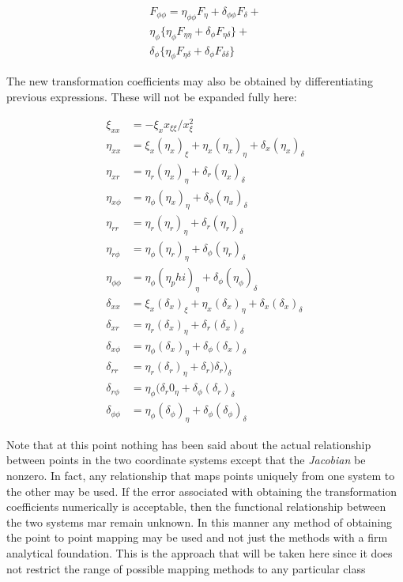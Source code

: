 \begin{multline}
  F_{\phi\phi} = \eta_{\phi\phi} F_\eta + \delta_{\phi\phi} F_\delta + \\
  \eta_\phi \{ \eta_\phi F_{\eta\eta} + \delta_\phi F_{\eta\delta} \} + \\
  \delta_\phi \{ \eta_\phi F_{\eta\delta} + \delta_\phi F_{\delta\delta} \}
\end{multline}

The new transformation coefficients may also be obtained by differentiating
previous expressions. These will not be expanded fully here:

\begin{equation}
  \begin{aligned}
    \xi_{xx} &= -\xi_x x_{\xi\xi}/x_\xi^2 \\
    \eta_{xx} &= \xi_x ( \eta_x)_\xi + \eta_x (\eta_x)_\eta + \delta_x(\eta_x)_\delta \\
    \eta_{xr} &= \eta_r(\eta_x)_\eta + \delta_r(\eta_x)_\delta \\
    \eta_{x\phi} &= \eta_\phi(\eta_x)_\eta + \delta_\phi(\eta_x)_\delta \\
    \eta_{rr} &= \eta_r(\eta_r)_\eta + \delta_r(\eta_r)_\delta \\
    \eta_{r\phi} &= \eta_\phi(\eta_r)_\eta + \delta_\phi(\eta_r)_\delta \\
    \eta_{\phi\phi} &= \eta_\phi(\eta_phi)_\eta + \delta_\phi(\eta_\phi)_\delta \\
    \delta_{xx} &= \xi_x (\delta_x)_\xi + \eta_x(\delta_x)_\eta + \delta_x(\delta_x)_\delta \\
    \delta_{xr} &= \eta_r (\delta_x)_\eta + \delta_r(\delta_x)_\delta \\
    \delta_{x\phi} &= \eta_\phi (\delta_x)_\eta + \delta_\phi(\delta_x)_\delta\\
    \delta_{rr} &= \eta_r (\delta_r)_\eta + \delta_r ) \delta_r)_\delta \\
    \delta_{r\phi} &= \eta_\phi(\delta_r0_\eta + \delta_\phi(\delta_r)_\delta  \\
    \delta_{\phi\phi} &= \eta_\phi(\delta_\phi)_\eta + \delta_\phi(\delta_\phi)_\delta
  \end{aligned}
\end{equation}

Note that at this point nothing has been said about the actual relationship
between points in the two coordinate systems except that the {\it Jacobian} be
nonzero. In fact, any relationship that maps points uniquely from one system to
the other may be used.  If the error associated with obtaining the
transformation coefficients numerically is acceptable, then the functional
relationship between the two systems mar remain unknown. In this manner any
method of obtaining the point to point mapping may be used and not just the
methods with a firm analytical foundation. This is the approach that will be
taken here since it does not restrict the range of possible mapping methods to
any particular class
